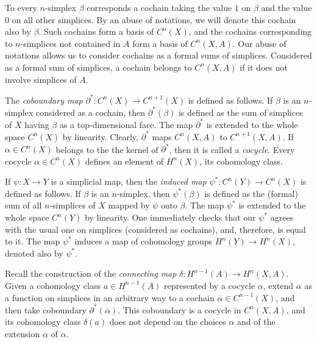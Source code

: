 \documentclass[leqno, 11pt]{article}\usepackage{latexsym}\usepackage{amsmath, amscd}\usepackage{amssymb}
\begin{document}
To every $n$-simplex $\beta$ corresponds a cochain taking the value $1$ on $\beta$ and the value $0$ on all other simplices. By an abuse of notations, 
we will denote this cochain also by $\beta$. Such cochains form a basis of $C^n(X)$, 
and the cochains corresponding to $n$-simplices not contained in $A$ form a basis of $C^n(X,A)$.
Our abuse of notations allows us to consider cochains as a formal sums of simplices. Considered as a formal sum of simplices, 
a cochain belongs to $C^n(X,A)$ if it does not involve simplices of $A$. 

The {\em coboundary map} $\partial^* : C^n(X)\rightarrow C^{n+1}(X)$ is defined as follows. If $\beta$ is an $n$-simplex considered as a cochain, 
then $\partial^*(\beta)$ 
is defined as the sum of simplices of $X$ having $\beta$ as a top-dimensional face. 
The map $\partial^*$ is extended to the whole space $C^n(X)$ by linearity. 
Clearly, $\partial^*$ maps $C^n(X,A)$ to $C^{n+1}(X,A)$. If $\alpha\in C^n (X)$ belongs to the the kernel of $\partial^*$, then it is called a {\em cocycle}. 
Every cocycle $\alpha\in C^n (X)$ defines an element of $H^n (X)$, its cohomology class. 

If $\psi: X \rightarrow Y$ is a simplicial map, then the {\em induced map} $\psi^*: C^n (Y)\rightarrow C^n (X)$ is defined  as follows. 
If $\beta$ is an $n$-simplex, then $\psi^*(\beta)$ is defined as the (formal) sum of all $n$-simplices of $X$ mapped by $\psi$ onto $\beta$. 
The map $\psi^*$ is extended to the whole space $C^n (Y)$ by linearity. One immediately checks that our $\psi^*$ agrees 
with the usual one on simplices (considered as cochains), and, therefore, is equal to it.
The map $\psi^*$ induces a map of cohomology groups $H^n (Y)\rightarrow H^n (X)$, denoted also by $\psi^*$. 

Recall the construction of the {\em connecting map} $\delta : H^{n-1}(A)\rightarrow H^n(X,A)$. Given a cohomology class $a\in H^{n-1}(A)$ represented
by a cocycle $\alpha$, extend  $\alpha$ as a function on simplices in an arbitrary way to a cochain $\overline{\alpha}\in C^{n-1}(X)$, 
and then take coboundary $\partial^*(\overline{\alpha})$. This coboundary is a cocycle in $C^n(X,A)$, and its cohomology class $\delta(a)$
does not depend on the choices $\alpha$ and of the extension $\overline{\alpha}$ of $\alpha$.
\end{document}
